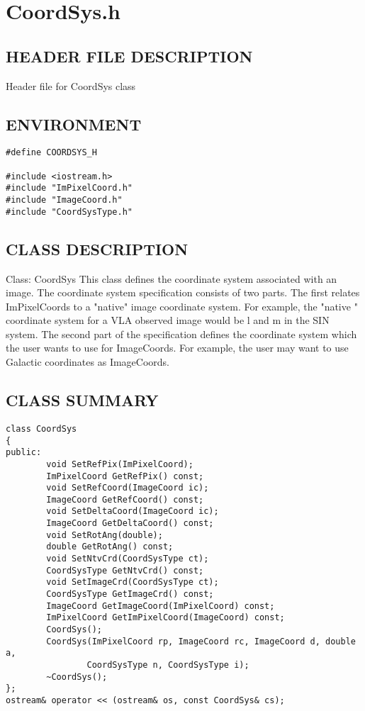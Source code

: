 \clearpage
\section{CoordSys.h}

\subsection*{HEADER FILE DESCRIPTION}
 Header file for CoordSys class  

\subsection*{ENVIRONMENT}
\begin{verbatim}
#define COORDSYS_H

#include <iostream.h>
#include "ImPixelCoord.h"
#include "ImageCoord.h"
#include "CoordSysType.h"
\end{verbatim}

\subsection*{CLASS DESCRIPTION}
    Class: CoordSys
          This class defines the coordinate system associated with an image.
   The coordinate system specification consists of two parts. The first
   relates ImPixelCoords to a "native" image coordinate system. For example,
   the "native " coordinate system for a VLA observed image would be
   l and m in the SIN system. The second part of the specification defines
   the coordinate system which the user wants to use for ImageCoords.
   For example, the user may want to use Galactic coordinates as ImageCoords.
  
\subsection*{CLASS SUMMARY}
\begin{verbatim}
class CoordSys
{
public:
        void SetRefPix(ImPixelCoord);
        ImPixelCoord GetRefPix() const;
        void SetRefCoord(ImageCoord ic);
        ImageCoord GetRefCoord() const;
        void SetDeltaCoord(ImageCoord ic);
        ImageCoord GetDeltaCoord() const;
        void SetRotAng(double);
        double GetRotAng() const;
        void SetNtvCrd(CoordSysType ct);
        CoordSysType GetNtvCrd() const;
        void SetImageCrd(CoordSysType ct);
        CoordSysType GetImageCrd() const;
        ImageCoord GetImageCoord(ImPixelCoord) const;
        ImPixelCoord GetImPixelCoord(ImageCoord) const;
        CoordSys();
        CoordSys(ImPixelCoord rp, ImageCoord rc, ImageCoord d, double a,
                CoordSysType n, CoordSysType i);
        ~CoordSys();
};
ostream& operator << (ostream& os, const CoordSys& cs);
\end{verbatim}

